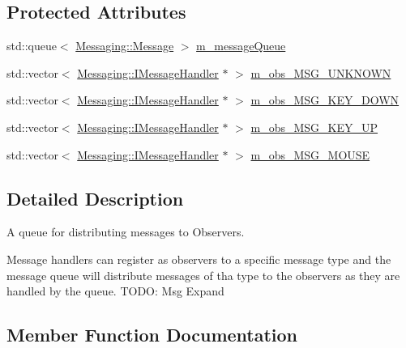 \subsection*{Protected Attributes}
\begin{DoxyCompactItemize}
\item 
std\+::queue$<$ \hyperlink{class_cookie_eng_1_1_messaging_1_1_message}{Messaging\+::\+Message} $>$ \hyperlink{class_cookie_eng_1_1_services_1_1_message_queue_a78777e2abfdd974561b81a3c06d185bf}{m\+\_\+message\+Queue}
\item 
std\+::vector$<$ \hyperlink{class_cookie_eng_1_1_messaging_1_1_i_message_handler}{Messaging\+::\+I\+Message\+Handler} $\ast$ $>$ \hyperlink{class_cookie_eng_1_1_services_1_1_message_queue_a377d77776078730deac58602ab35bf6c}{m\+\_\+obs\+\_\+\+M\+S\+G\+\_\+\+U\+N\+K\+N\+O\+WN}
\item 
std\+::vector$<$ \hyperlink{class_cookie_eng_1_1_messaging_1_1_i_message_handler}{Messaging\+::\+I\+Message\+Handler} $\ast$ $>$ \hyperlink{class_cookie_eng_1_1_services_1_1_message_queue_acff4df9b3d2164173c1aad88fd894c87}{m\+\_\+obs\+\_\+\+M\+S\+G\+\_\+\+K\+E\+Y\+\_\+\+D\+O\+WN}
\item 
std\+::vector$<$ \hyperlink{class_cookie_eng_1_1_messaging_1_1_i_message_handler}{Messaging\+::\+I\+Message\+Handler} $\ast$ $>$ \hyperlink{class_cookie_eng_1_1_services_1_1_message_queue_adadeff05bbf5d9260948094904a9b611}{m\+\_\+obs\+\_\+\+M\+S\+G\+\_\+\+K\+E\+Y\+\_\+\+UP}
\item 
std\+::vector$<$ \hyperlink{class_cookie_eng_1_1_messaging_1_1_i_message_handler}{Messaging\+::\+I\+Message\+Handler} $\ast$ $>$ \hyperlink{class_cookie_eng_1_1_services_1_1_message_queue_a0fe2077166687dff340472158b85af06}{m\+\_\+obs\+\_\+\+M\+S\+G\+\_\+\+M\+O\+U\+SE}
\end{DoxyCompactItemize}


\subsection{Detailed Description}
A queue for distributing messages to Observers. 

Message handlers can register as observers to a specific message type and the message queue will distribute messages of tha type to the observers as they are handled by the queue. T\+O\+DO\+: Msg Expand 

\subsection{Member Function Documentation}
\mbox{\label{class_cookie_eng_1_1_services_1_1_message_queue_a33acc39b1189fd0ced268ee68e3eba7a}} 
